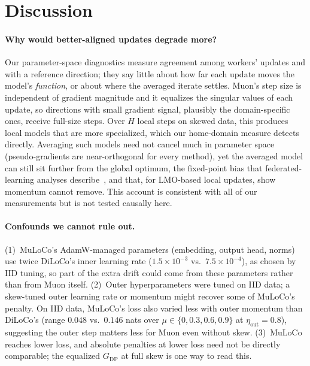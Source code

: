 \documentclass{article}
\begin{document}
\section{Discussion}\label{sec:discussion}

\paragraph{Why would better-aligned updates degrade more?} Our parameter-space diagnostics measure agreement among workers' updates and with a reference direction; they say little about how far each update moves the model's \emph{function}, or about where the averaged iterate settles. Muon's
step size is independent of gradient magnitude and it equalizes the singular values of each update, so directions with small gradient signal, plausibly the domain-specific ones, receive full-size steps. Over $H$ local steps on
skewed data, this produces local models that are more specialized, which our home-domain measure detects directly. Averaging such models need not cancel much in parameter space (pseudo-gradients are near-orthogonal for every
method), yet the averaged model can still sit further from the global optimum, the fixed-point bias that federated-learning analyses describe~\cite{pathak2020fedsplit,charles2021convergence}, and that, for LMO-based local updates, \citet{takezawa2026fedmuon} show momentum cannot remove. This account is consistent with all of our measurements but is not tested causally here.

\paragraph{Confounds we cannot rule out.} (1)~MuLoCo's AdamW-managed parameters (embedding, output head, norms) use twice DiLoCo's inner learning rate ($1.5\times10^{-3}$ vs.\ $7.5\times10^{-4}$), as chosen by IID tuning, so part of the extra drift could come from these parameters rather than from Muon itself. (2)~Outer hyperparameters were tuned on IID data; a skew-tuned outer learning rate or momentum might recover some of MuLoCo's penalty. On IID data, MuLoCo's loss also varied less with outer momentum than DiLoCo's (range $0.048$ vs.\ $0.146$ nats over $\mu \in \{0, 0.3, 0.6, 0.9\}$ at $\eta_{\mathrm{out}}=0.8$), suggesting the outer step matters less for Muon even without skew. (3)~MuLoCo reaches lower loss, and absolute penalties at lower loss need not be directly comparable; the equalized $G_{\mathrm{DP}}$ at full skew is one way to read this.
\end{document}
